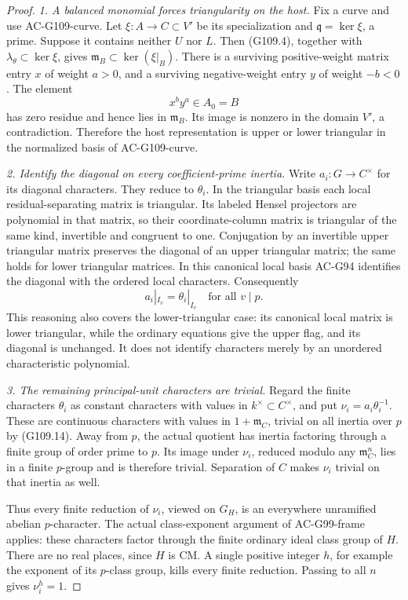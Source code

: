 \begin{proof}
\emph{1. A balanced monomial forces triangularity on the host.}
Fix a curve and use AC-G109-curve.  Let
\(\xi:A\to C\subset V'\) be its specialization and
\(\mathfrak q=\ker\xi\), a prime.  Suppose it contains
neither \(U\) nor \(L\).
Then (G109.4), together with \(\lambda_\theta\subset\ker\xi\),
gives \(\mathfrak m_B\subset\ker(\xi|_B)\).
There is a surviving positive-weight matrix entry \(x\)
of weight \(a>0\), and a surviving negative-weight entry
\(y\) of weight \(-b<0\).  The element
\[
                        x^b y^a\in A_0=B
 \tag{G109.13}
\]
has zero residue and hence lies in \(\mathfrak m_B\).
Its image is nonzero in the domain \(V'\), a contradiction.
Therefore the host representation is upper or lower triangular
in the normalized basis of AC-G109-curve.

\emph{2. Identify the diagonal on every coefficient-prime inertia.}
Write \(a_i:G\to C^\times\) for its diagonal characters.
They reduce to \(\theta_i\).
In the triangular basis each local residual-separating matrix
is triangular.  Its labeled Hensel projectors are polynomial
in that matrix, so their coordinate-column matrix is
triangular of the same kind, invertible and congruent to one.
Conjugation by an invertible upper triangular matrix preserves
the diagonal of an upper triangular matrix; the same holds
for lower triangular matrices.  In this canonical local basis
AC-G94 identifies the diagonal with the ordered local
characters.  Consequently
\[
       a_i|_{I_v}=\theta_i|_{I_v}\quad\text{for all }v\mid p.
 \tag{G109.14}
\]
This reasoning also covers the lower-triangular case: its
canonical local matrix is lower triangular, while the ordinary
equations give the upper flag, and its diagonal is unchanged.
It does not identify characters merely by an unordered
characteristic polynomial.

\emph{3. The remaining principal-unit characters are trivial.}
Regard the finite characters \(\theta_i\) as constant
characters with values in \(k^\times\subset C^\times\), and put
\(\nu_i=a_i\theta_i^{-1}\).
These are continuous characters with values in
\(1+\mathfrak m_C\), trivial on all inertia over \(p\)
by (G109.14).
Away from \(p\), the actual quotient has inertia factoring
through a finite group of order prime to \(p\).
Its image under \(\nu_i\), reduced modulo any
\(\mathfrak m_C^n\), lies in a finite \(p\)-group and is
therefore trivial.  Separation of \(C\) makes \(\nu_i\)
trivial on that inertia as well.

Thus every finite reduction of \(\nu_i\), viewed on \(G_H\),
is an everywhere unramified abelian \(p\)-character.
The actual class-exponent argument of AC-G99-frame applies:
these characters factor through the finite ordinary ideal
class group of \(H\).  There are no real places, since \(H\)
is CM.  A single positive integer \(h\), for example the
exponent of its \(p\)-class group, kills every finite reduction.
Passing to all \(n\) gives \(\nu_i^h=1\).


\end{proof}
